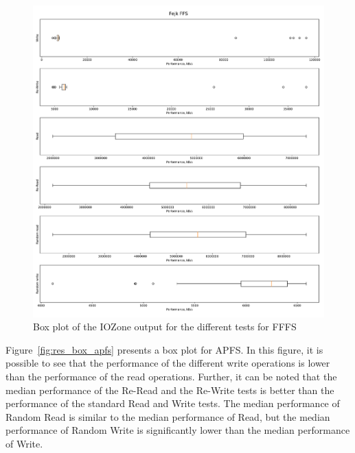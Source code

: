 \begin{figure}[!htb]
	\label{fig:res_box_fffs}
	\begin{center}
		\includegraphics[width=1.0\textwidth]{figures/benchmarking/fake-ffs/Fejk FFS-box.pdf}
	\end{center}
	\caption{Box plot of the IOZone output for the different tests for FFFS}
\end{figure}

Figure~\ref{fig:res_box_apfs} presents a box plot for APFS. In this figure, it is possible to see that the performance of the different write operations is lower than the performance of the read operations. Further, it can be noted that the median performance of the Re-Read and the Re-Write tests is better than the performance of the standard Read and Write tests. The median performance of Random Read is similar to the median performance of Read, but the median performance of Random Write is significantly lower than the median performance of Write.

